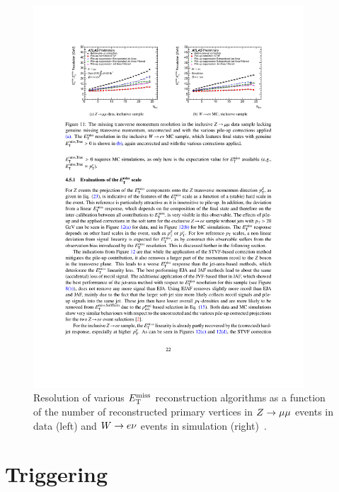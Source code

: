 \begin{figure}[tp]
  \centering
  \includegraphics[width=0.90\textwidth]{figures/performance/met-resolutionvsnpv}
  \caption{Resolution of various $E_{\mathrm{T}}^{\mathrm{miss}}$ reconstruction algorithms as a function of the number of reconstructed primary vertices in $Z \rightarrow \mu\mu$ events in data (left) and $W \rightarrow e\nu$ events in simulation (right)~\cite{ATLAS-CONF-2014-019}.}
  \label{fig:objects-met-resolution}
\end{figure}

\section{Triggering}
\label{sec:trigger}

